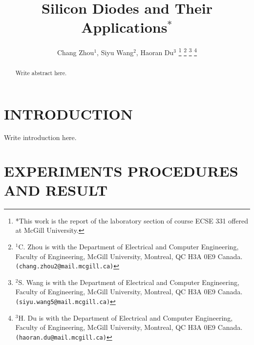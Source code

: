 \documentclass[letterpaper, 10 pt, conference]{ieeeconf}  %
\title{\LARGE \bf Silicon Diodes and Their Applications$^{*}$}
\author{Chang Zhou$^{1}$, Siyu Wang$^{2}$, Haoran Du$^{3}$%
\thanks{*This work is the report of the laboratory section of course ECSE 331 offered at McGill University.}%
\thanks{$^{1}$C. Zhou is with the Department of Electrical and Computer
Engineering, Faculty of Engineering, McGill University, Montreal, QC H3A 0E9 Canada.
{\tt\small (chang.zhou2@mail.mcgill.ca)}}%
\thanks{$^{2}$S. Wang is with the Department of Electrical and Computer
Engineering, Faculty of Engineering, McGill University, Montreal, QC H3A 0E9 Canada.
{\tt\small (siyu.wang5@mail.mcgill.ca)}}%
\thanks{$^{3}$H. Du is with the Department of Electrical and Computer
Engineering, Faculty of Engineering, McGill University, Montreal, QC H3A 0E9 Canada.
{\tt\small (haoran.du@mail.mcgill.ca)}}%
}
\begin{document}
    \maketitle
    \thispagestyle{empty}
    \pagestyle{empty}


    \begin{abstract}
        Write abstract here.
    \end{abstract}


    \section{INTRODUCTION}
    Write introduction here.
    \section{EXPERIMENTS PROCEDURES AND RESULT}
\end{document}
